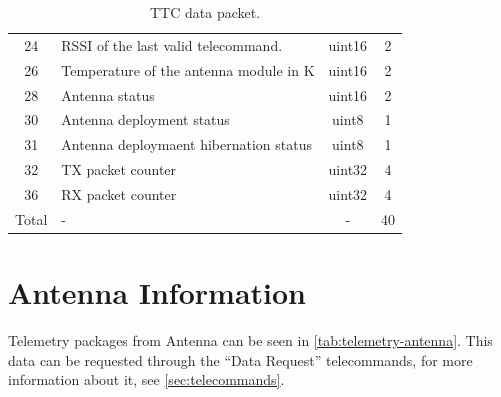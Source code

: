 \begin{table}[!ht]
\begin{tabular}{clcc}
		24                  & RSSI of the last valid telecommand.       & uint16             & 2                     \\
        26                  & Temperature of the antenna module in K    & uint16             & 2                     \\
        28                  & Antenna status                            & uint16             & 2                     \\
		30                  & Antenna deployment status                 & uint8              & 1                     \\
		31                  & Antenna deploymaent hibernation status    & uint8              & 1                     \\
		32                  & TX packet counter                         & uint32             & 4                     \\
		36                  & RX packet counter                         & uint32             & 4                     \\
		\midrule                                                                                                    
        Total               & -                                         & -                  & 40                    \\
		\bottomrule[1.5pt]
	\end{tabular}
	\caption{TTC data packet.}
	\label{tab:telemetry-ttc}
\end{table}

\section{Antenna Information}

Telemetry packages from Antenna can be seen in \autoref{tab:telemetry-antenna}. This data can be requested through the ``Data Request'' telecommands, for more information about it, see \autoref{sec:telecommands}.

